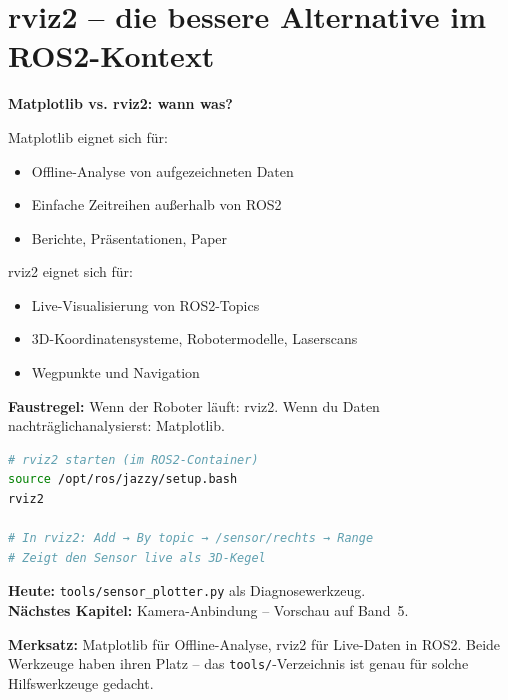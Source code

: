 \section{rviz2 -- die bessere Alternative im ROS2-Kontext}

\begin{haubeBox}
\textbf{Matplotlib vs. rviz2: wann was?}

Matplotlib eignet sich für:
\begin{itemize}
\item Offline-Analyse von aufgezeichneten Daten
\item Einfache Zeitreihen außerhalb von ROS2
\item Berichte, Präsentationen, Paper
\end{itemize}

rviz2 eignet sich für:
\begin{itemize}
\item Live-Visualisierung von ROS2-Topics
\item 3D-Koordinatensysteme, Robotermodelle, Laserscans
\item Wegpunkte und Navigation
\end{itemize}

\textbf{Faustregel:} Wenn der Roboter läuft: rviz2.
Wenn du Daten nachträglichanalysierst: Matplotlib.
\end{haubeBox}

\begin{lstlisting}[language=bash]
# rviz2 starten (im ROS2-Container)
source /opt/ros/jazzy/setup.bash
rviz2

# In rviz2: Add → By topic → /sensor/rechts → Range
# Zeigt den Sensor live als 3D-Kegel
\end{lstlisting}

\begin{projektBox}
\textbf{Heute:} \texttt{tools/sensor\_plotter.py} als Diagnosewerkzeug.\\
\textbf{Nächstes Kapitel:} Kamera-Anbindung -- Vorschau auf Band~5.
\end{projektBox}

\begin{merksatzBox}
\textbf{Merksatz:} Matplotlib für Offline-Analyse, rviz2 für Live-Daten in ROS2.
Beide Werkzeuge haben ihren Platz -- das \texttt{tools/}-Verzeichnis
ist genau für solche Hilfswerkzeuge gedacht.
\end{merksatzBox}


